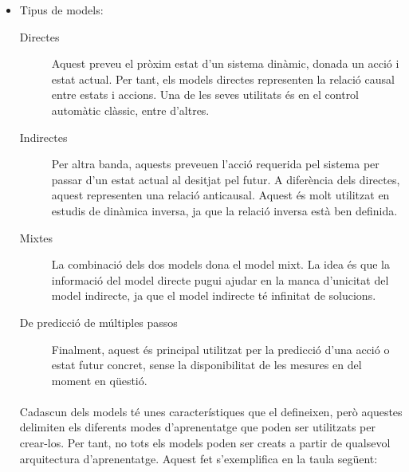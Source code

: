 \documentclass[12pt,a4paper,final,twoside]{article}
\begin{document}
\begin{itemize}
\item Tipus de models:

\begin{description}

\item[Directes] Aquest preveu el pròxim estat d'un sistema dinàmic, donada un acció i estat actual. Per tant, els models directes representen la relació causal entre estats i accions. Una de les seves utilitats és en el control automàtic clàssic, entre d'altres.

\item[Indirectes] Per altra banda, aquests preveuen l'acció requerida pel sistema per passar d'un estat actual al desitjat pel futur. A diferència dels directes, aquest representen una relació anticausal. Aquest és molt utilitzat en estudis de dinàmica inversa, ja que la relació inversa està ben definida.

\item[Mixtes] La combinació dels dos models dona el model mixt. La idea és que la informació del model directe pugui ajudar en la manca d'unicitat del model indirecte, ja que el model indirecte té infinitat de solucions. 

\item[De predicció de múltiples passos] Finalment, aquest és principal utilitzat per la predicció d'una acció o estat futur concret, sense la disponibilitat de les mesures en del moment en qüestió.

\end{description}

\paragraph{}Cadascun dels models té unes característiques que el defineixen, però aquestes delimiten els diferents modes d'aprenentatge que poden ser utilitzats per crear-los. Per tant, no tots els models poden ser creats a partir de qualsevol arquitectura d'aprenentatge. Aquest fet s'exemplifica en la taula següent:

\end{itemize}

\paragraph{} %
\end{document}
